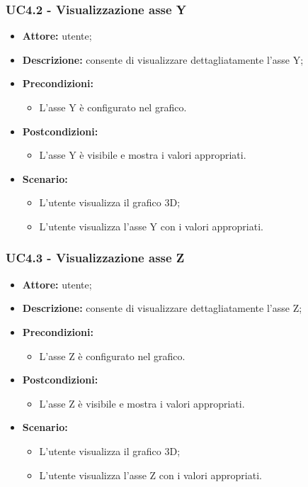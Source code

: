 \subsubsection{UC4.2 - Visualizzazione asse Y}
\begin{itemize}
    \item \textbf{Attore:} utente;
    \item \textbf{Descrizione:} consente di visualizzare dettagliatamente l'asse Y;
    \item \textbf{Precondizioni:} 
    \begin{itemize}
        \item L'asse Y è configurato nel grafico.
    \end{itemize}
    \item \textbf{Postcondizioni:} 
    \begin{itemize}
        \item L'asse Y è visibile e mostra i valori appropriati.
    \end{itemize}
    \item \textbf{Scenario:} 
    \begin{itemize}
        \item L'utente visualizza il grafico 3D;
        \item L'utente visualizza l'asse Y con i valori appropriati.
    \end{itemize}
\end{itemize}
\subsubsection{UC4.3 - Visualizzazione asse Z}
\begin{itemize}
    \item \textbf{Attore:} utente;
    \item \textbf{Descrizione:} consente di visualizzare dettagliatamente l'asse Z;
    \item \textbf{Precondizioni:} 
    \begin{itemize}
        \item L'asse Z è configurato nel grafico.
    \end{itemize}
    \item \textbf{Postcondizioni:} 
    \begin{itemize}
        \item L'asse Z è visibile e mostra i valori appropriati.
    \end{itemize}
    \item \textbf{Scenario:} 
    \begin{itemize}
        \item L'utente visualizza il grafico 3D;
        \item L'utente visualizza l'asse Z con i valori appropriati.
    \end{itemize}
\end{itemize}
